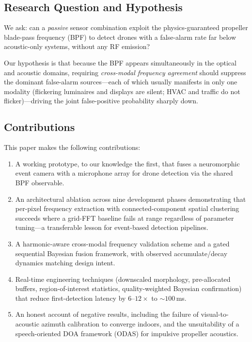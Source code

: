 \documentclass[conference]{IEEEtran}
\begin{document}
\subsection{Research Question and Hypothesis}
We ask: can a \emph{passive} sensor combination exploit the
physics-guaranteed propeller blade-pass frequency (BPF) to detect drones
with a false-alarm rate far below acoustic-only systems, without any RF
emission?

Our hypothesis is that because the BPF appears simultaneously in the
optical and acoustic domains, requiring \emph{cross-modal frequency
agreement} should suppress the dominant false-alarm sources---each of
which usually manifests in only one modality (flickering luminaires and
displays are silent; HVAC and traffic do not flicker)---driving the joint
false-positive probability sharply down.

\subsection{Contributions}
This paper makes the following contributions:
\begin{enumerate}
\item A working prototype, to our knowledge the first, that fuses a
      neuromorphic event camera with a microphone array for drone
      detection via the shared BPF observable.
\item An architectural ablation across nine development phases
      demonstrating that per-pixel frequency extraction with
      connected-component spatial clustering succeeds where a grid-FFT
      baseline fails at range regardless of parameter tuning---a
      transferable lesson for event-based detection pipelines.
\item A harmonic-aware cross-modal frequency validation scheme and a
      gated sequential Bayesian fusion framework, with observed
      accumulate/decay dynamics matching design intent.
\item Real-time engineering techniques (downscaled morphology,
      pre-allocated buffers, region-of-interest statistics,
      quality-weighted Bayesian confirmation) that reduce first-detection
      latency by $6$--$12\times$ to ${\sim}100$\,ms.
\item An honest account of negative results, including the failure of
      visual-to-acoustic azimuth calibration to converge indoors, and the
      unsuitability of a speech-oriented DOA framework (ODAS) for
      impulsive propeller acoustics.
\end{enumerate}
\end{document}
